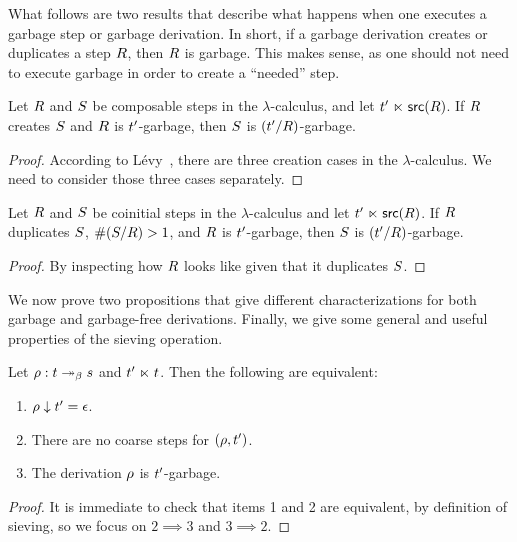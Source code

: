 What follows are two results that describe what happens when one executes a garbage step or garbage derivation.
In short, if a garbage derivation creates or duplicates a step $R$,
then $R$ is garbage.
This makes sense, as one should not need to execute garbage in order to create a ``needed'' step.

\begin{lemma}
Let $R$ and $S$ be composable steps in the $\lambda$-calculus,
and let $t' \mathrel{\ltimes} \mathsf{src}(R)$.
If $R$ creates $S$ and $R$ is $t'$-garbage,
then $S$ is $(t'/R)$-garbage.
\end{lemma}
\begin{proof} According to L\'evy~\cite{Tesis:Levy:1978},
there are three creation cases in the $\lambda$-calculus.
We need to consider those three cases separately. 
\end{proof}

\begin{lemma}
Let $R$ and $S$ be coinitial steps in the $\lambda$-calculus
and let $t' \mathrel{\ltimes} \mathsf{src}(R)$.
If $R$ duplicates $S$, \ie $\#(S/R) > 1$,
and $R$ is $t'$-garbage,
then $S$ is $(t'/R)$-garbage.
\end{lemma}
\begin{proof}
 By inspecting how $R$ looks like given that it duplicates
$S$.
\end{proof}

We now prove two propositions that give different characterizations for both garbage and
garbage-free derivations. Finally, we give some general and useful properties of the
sieving operation.

\begin{proposition}
Let $\rho : t \mathrel{\twoheadrightarrow_\beta} s$ and $t' \mathrel{\ltimes} t$.
Then the following are equivalent:
\begin{enumerate}
\item $\rho \downarrow t' = \epsilon$.
\item There are no coarse steps for $(\rho,t')$.
\item The derivation $\rho$ is $t'$-garbage.
\end{enumerate}
\end{proposition}
\begin{proof}
It is immediate to check that items 1 and 2 are equivalent, by definition of sieving,
so we focus on $2 \implies 3$ and $3 \implies 2$. 
\end{proof}

